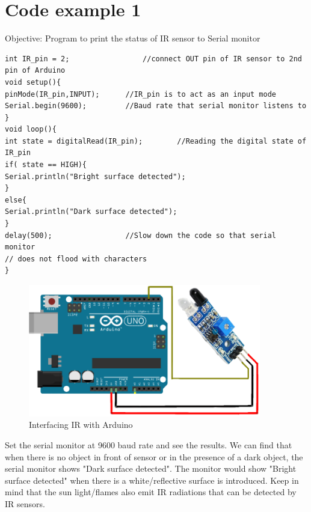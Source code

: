 \section{\textbf{Code example 1}}
Objective: Program to print the status of IR sensor to Serial monitor \\
\vspace{0.2cm}
\begin{lstlisting}[style=CStyle]
int IR_pin = 2;					//connect OUT pin of IR sensor to 2nd pin of Arduino
void setup(){
pinMode(IR_pin,INPUT);		//IR_pin is to act as an input mode
Serial.begin(9600);			//Baud rate that serial monitor listens to
}
void loop(){
int state = digitalRead(IR_pin);		//Reading the digital state of IR_pin
if( state == HIGH){
Serial.println("Bright surface detected");
}
else{
Serial.println("Dark surface detected");
}
delay(500);					//Slow down the code so that serial monitor
// does not flood with characters
} 
\end{lstlisting}
\vspace{0.5cm
}
\begin{figure}[h!]	
	\centering
	\includegraphics[width=4in]{Chapters/images/IR_circuit_eg.png}
	\caption{Interfacing IR with Arduino}
\end{figure}
\vspace{0.5cm}

Set the serial monitor at 9600 baud rate and see the results. We can find that when there is no object in front of sensor or in the presence of a dark object, the serial monitor shows "Dark surface detected". The monitor would show "Bright surface detected" when there is a white/reflective surface is introduced. Keep in mind that the sun light/flames also emit IR radiations that can be detected by IR sensors.

